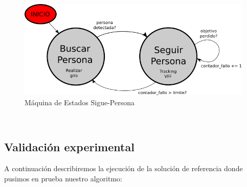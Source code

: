 \begin{figure} [H]
  \begin{center}
    \includegraphics[width=12cm]{imagenes/cap6/maquina-estados.png}
  \end{center}
  \caption[Máquina de Estados Sigue-Persona]{Máquina de Estados Sigue-Persona}
  \label{fig:maquina_estados}
\end{figure}\


\subsection{Validación experimental}
\label{subsec:validacion_experimental_sim}

A continuación describiremos la ejecución de la solución de referencia donde pusimos en prueba nuestro algoritmo:

